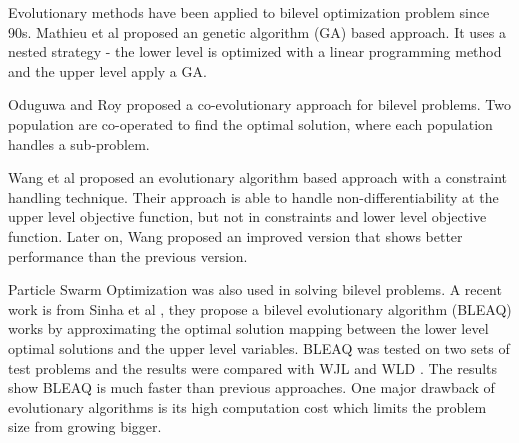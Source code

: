 Evolutionary methods have been applied to bilevel optimization problem since 90s. Mathieu et al \cite{Mathieu:1994dw} proposed an genetic algorithm (GA) based approach. It uses a nested strategy - the lower level is optimized with a linear programming method and the upper level apply a GA.

Oduguwa and Roy \cite{Oduguwa:2002kr} proposed a co-evolutionary approach for bilevel problems. Two population are co-operated to find the optimal solution, where each population handles a sub-problem. 

Wang et al \cite{Wang:2005fa} proposed an evolutionary algorithm based approach with a constraint handling technique.  Their approach is able to handle non-differentiability at the upper level objective function, but not in constraints and lower  level objective function.
Later on, Wang proposed an improved version \cite{Wang:2011di} that shows better performance than the previous version.

Particle Swarm Optimization \cite{Li:2006br} was also used in solving bilevel problems.
A recent work is from Sinha et al \cite{:2013tn}, they propose a bilevel evolutionary algorithm (BLEAQ) works by approximating the optimal solution mapping between the lower level optimal solutions and the upper level variables.  BLEAQ was tested on two sets of test problems and the results were compared with WJL \cite{Wang:2005fa} and WLD \cite{Wang:2011di}. The results show BLEAQ is much faster than previous approaches.
One major drawback of evolutionary algorithms is its high computation cost which limits the problem size from growing bigger.



